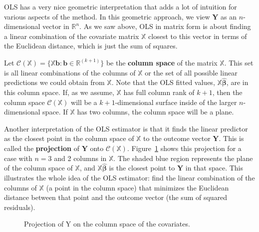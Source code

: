 \documentclass[
  13pt,
  letterpaper,
  DIV=11,
  numbers=noendperiod]{scrreprt}
\newcommand{\mb}{\symbf}
\newcommand{\Xmat}{\mathbb{X}}
\newcommand{\bhat}{\widehat{\mb{\beta}}}
\theoremstyle{plain}
\theoremstyle{definition}
\theoremstyle{definition}
\theoremstyle{remark}
\begin{document}
OLS has a very nice geometric interpretation that adds a lot of
intuition for various aspects of the method. In this geometric approach,
we view \(\mb{Y}\) as an \(n\)-dimensional vector in \(\mathbb{R}^n\).
As we saw above, OLS in matrix form is about finding a linear
combination of the covariate matrix \(\Xmat\) closest to this vector in
terms of the Euclidean distance, which is just the sum of squares.

Let
\(\mathcal{C}(\Xmat) = \{\Xmat\mb{b} : \mb{b} \in \mathbb{R}^(k+1)\}\)
be the \textbf{column space} of the matrix \(\Xmat\). This set is all
linear combinations of the columns of \(\Xmat\) or the set of all
possible linear predictions we could obtain from \(\Xmat\). Note that
the OLS fitted values, \(\Xmat\bhat\), are in this column space. If, as
we assume, \(\Xmat\) has full column rank of \(k+1\), then the column
space \(\mathcal{C}(\Xmat)\) will be a \(k+1\)-dimensional surface
inside of the larger \(n\)-dimensional space. If \(\Xmat\) has two
columns, the column space will be a plane.

Another interpretation of the OLS estimator is that it finds the linear
predictor as the closest point in the column space of \(\Xmat\) to the
outcome vector \(\mb{Y}\). This is called the \textbf{projection} of
\(\mb{Y}\) onto \(\mathcal{C}(\Xmat)\). Figure~\ref{fig-projection}
shows this projection for a case with \(n=3\) and 2 columns in
\(\Xmat\). The shaded blue region represents the plane of the column
space of \(\Xmat\), and \(\Xmat\bhat\) is the closest point to
\(\mb{Y}\) in that space. This illustrates the whole idea of the OLS
estimator: find the linear combination of the columns of \(\Xmat\) (a
point in the column space) that minimizes the Euclidean distance between
that point and the outcome vector (the sum of squared residuals).

\begin{figure}[th]


\caption{\label{fig-projection}Projection of Y on the column space of
the covariates.}

\end{figure}%
\end{document}

